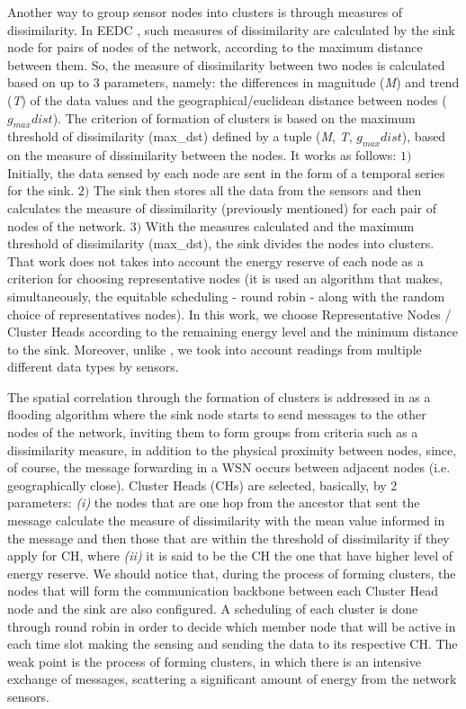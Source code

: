 \documentclass[conference]{IEEEtran}
\begin{document}
Another way to group sensor nodes into clusters is through measures of
dissimilarity.
In EEDC \cite{Liu2007}, such measures of dissimilarity are calculated by the
sink node for pairs of nodes of the network, according to the maximum distance
between them.
So, the measure of dissimilarity between two nodes is calculated based on up to
$3$ parameters, namely:
the differences in magnitude (\textit{M}) and trend (\textit{T}) of the data
values and the geographical/euclidean distance between nodes ($g_{max}dist$).
The criterion of formation of clusters is based on the maximum threshold of
dissimilarity (max\_dst) defined by a tuple (\textit{M}, \textit{T},
$g_{max}dist$), based on the measure of dissimilarity between the nodes. It
works as follows: $1)$ Initially, the data sensed by each node are sent in the
form of a temporal series for the sink. $2)$ The sink then stores all the data
from the sensors and then calculates the measure of dissimilarity (previously
mentioned) for each pair of nodes of the network. $3)$ With the measures
calculated and the maximum threshold of dissimilarity (max\_dst), the sink
divides the nodes into clusters. 
That work does not takes into account the energy reserve of each node as a
criterion for choosing representative nodes (it is used an algorithm that makes,
simultaneously, the equitable scheduling - round robin - along with the random
choice of representatives nodes). In this work, we choose Representative Nodes /
Cluster Heads according to the remaining energy level and the minimum distance
to the sink. Moreover, unlike \cite{Liu2007}, we took into account readings from
multiple different data types by sensors.

The spatial correlation through the formation of clusters is addressed in
\cite{Pham2010} as a flooding algorithm where the sink node starts to
send messages to the other nodes of the network, inviting them to form groups
from criteria such as a dissimilarity measure, in addition to the physical
proximity between nodes, since, of course, the message forwarding in a WSN
occurs between adjacent nodes (i.e. geographically close). Cluster Heads (CHs)
are selected, basically, by 2 parameters: {\it (i)} the nodes that are one hop
from the ancestor that sent the message calculate the measure of dissimilarity
with the mean value informed in the message and then those that are within the
threshold of dissimilarity if they apply for CH, where {\it (ii)} it is said to
be the CH the one that have higher level of energy reserve.
We should notice that, during the process of forming clusters, the nodes that
will form the communication backbone between each Cluster Head node and the sink
are also configured. A scheduling of each cluster is done through round robin in
order to decide which member node that will be active in each time slot making
the sensing and sending the data to its respective CH.
The weak point is the process of forming clusters, in
which there is an intensive exchange of messages, scattering a significant
amount of energy from the network sensors.
\end{document}
